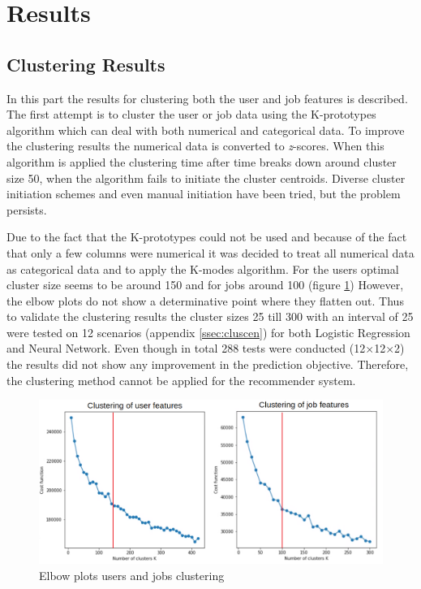 \section{Results}
\label{sec:rslts}


\subsection{Clustering Results}
\label{ssec:clures}
In this part the results for clustering both the user and job features is described.
The first attempt is to cluster the user or job data using the K-prototypes algorithm which can deal with both numerical and categorical data. 
To improve the clustering results the numerical data is converted to \textit{z}-scores.
When this algorithm is applied the clustering time after time breaks down around cluster size 50, when the algorithm fails to initiate the cluster centroids. 
Diverse cluster initiation schemes and even manual initiation have been tried, but the problem persists. 

Due to the fact that the K-prototypes could not be used and because of the fact that only a few columns were numerical it was decided to treat all numerical data as categorical data and to apply the K-modes algorithm.
For the users optimal cluster size seems to be around 150 and for jobs around 100 (figure \ref{fig:eb})
However, the elbow plots do not show a determinative point where they flatten out.
Thus to validate the clustering results the cluster sizes 25 till 300 with an interval of 25 were tested on 12 scenarios (appendix \ref{ssec:cluscen}) for both Logistic Regression and Neural Network.
Even though in total 288 tests were  conducted (12$\times$12$\times$2) the results did not show any improvement in the prediction objective. 
Therefore, the clustering method cannot be applied for the recommender system.

\begin{figure}[H]
    \centering
    \includegraphics[width=\linewidth]{ThesisTemplate/Images/Clustering.png}
    \caption{\label{fig:eb} Elbow plots users and jobs clustering}
\end{figure}

